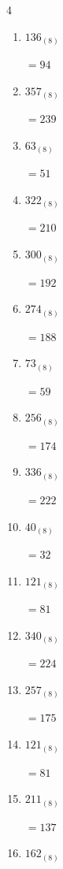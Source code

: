 \begin{multicols}{4}
\begin{enumerate}
        $=55$

  \item $136_{(8)}$

        $=94$

  \item $357_{(8)}$

        $=239$

  \item $63_{(8)}$

        $=51$

  \item $322_{(8)}$

        $=210$

  \item $300_{(8)}$

        $=192$

  \item $274_{(8)}$

        $=188$

  \item $73_{(8)}$

        $=59$

\columnbreak %

\resetques

  \item $256_{(8)}$

        $=174$

  \item $336_{(8)}$

        $=222$

  \item $40_{(8)}$

        $=32$

  \item $121_{(8)}$

        $=81$

  \item $340_{(8)}$

        $=224$

  \item $257_{(8)}$

        $=175$

  \item $121_{(8)}$

        $=81$

  \item $211_{(8)}$

        $=137$

  \item $162_{(8)}$


\end{enumerate}
\end{multicols}
